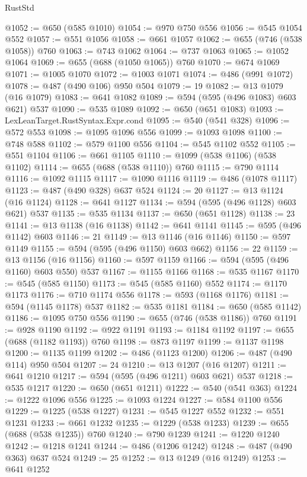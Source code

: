 \begin{lexlean}{RustStd}
\begin{coremodule}
@1052 := @650 (@585 @1010)
@1054 := @970 @750 @556
@1056 := @545 @1054 @552
@1057 := @551 @1056
@1058 := @661 @1057
@1062 := @655 (@746 (@538 @1058)) @760
@1063 := @743 @1062
@1064 := @737 @1063
@1065 := @1052 @1064
@1069 := @655 (@688 (@1050 @1065)) @760
@1070 := @674 @1069
@1071 := @1005 @1070
@1072 := @1003 @1071
@1074 := @486 (@991 @1072)
@1078 := @487 (@490 @106) @950 @504
@1079 := 19
@1082 := @13 @1079 (@16 @1079)
@1083 := @641 @1082
@1089 := @594 (@595 (@496 @1083) @603 @621) @537
@1090 := @535 @1089
@1092 := @650 (@651 @1083)
@1093 := LexLeanTarget.RustSyntax.Expr.cond
@1095 := @540 (@541 @328)
@1096 := @572 @553
@1098 := @1095 @1096 @556
@1099 := @1093 @1098
@1100 := @748 @588
@1102 := @579 @1100 @556
@1104 := @545 @1102 @552
@1105 := @551 @1104
@1106 := @661 @1105
@1110 := @1099 (@538 @1106) (@538 @1102)
@1114 := @655 (@688 (@538 @1110)) @760
@1115 := @790 @1114
@1116 := @1092 @1115
@1117 := @1090 @1116
@1119 := @486 (@1078 @1117)
@1123 := @487 (@490 @328) @637 @524
@1124 := 20
@1127 := @13 @1124 (@16 @1124)
@1128 := @641 @1127
@1134 := @594 (@595 (@496 @1128) @603 @621) @537
@1135 := @535 @1134
@1137 := @650 (@651 @1128)
@1138 := 23
@1141 := @13 @1138 (@16 @1138)
@1142 := @641 @1141
@1145 := @595 (@496 @1142) @603
@1146 := 21
@1149 := @13 @1146 (@16 @1146)
@1150 := @597 @1149
@1155 := @594 (@595 (@496 @1150) @603 @662)
@1156 := 22
@1159 := @13 @1156 (@16 @1156)
@1160 := @597 @1159
@1166 := @594 (@595 (@496 @1160) @603 @550) @537
@1167 := @1155 @1166
@1168 := @535 @1167
@1170 := @545 (@585 @1150)
@1173 := @545 (@585 @1160) @552
@1174 := @1170 @1173
@1176 := @710 @1174 @556
@1178 := @593 (@1168 @1176)
@1181 := @594 (@1145 @1178) @537
@1182 := @535 @1181
@1184 := @650 (@585 @1142)
@1186 := @1095 @750 @556
@1190 := @655 (@746 (@538 @1186)) @760
@1191 := @928 @1190
@1192 := @922 @1191
@1193 := @1184 @1192
@1197 := @655 (@688 (@1182 @1193)) @760
@1198 := @873 @1197
@1199 := @1137 @1198
@1200 := @1135 @1199
@1202 := @486 (@1123 @1200)
@1206 := @487 (@490 @114) @950 @504
@1207 := 24
@1210 := @13 @1207 (@16 @1207)
@1211 := @641 @1210
@1217 := @594 (@595 (@496 @1211) @603 @621) @537
@1218 := @535 @1217
@1220 := @650 (@651 @1211)
@1222 := @540 (@541 @363)
@1224 := @1222 @1096 @556
@1225 := @1093 @1224
@1227 := @584 @1100 @556
@1229 := @1225 (@538 @1227)
@1231 := @545 @1227 @552
@1232 := @551 @1231
@1233 := @661 @1232
@1235 := @1229 (@538 @1233)
@1239 := @655 (@688 (@538 @1235)) @760
@1240 := @790 @1239
@1241 := @1220 @1240
@1242 := @1218 @1241
@1244 := @486 (@1206 @1242)
@1248 := @487 (@490 @363) @637 @524
@1249 := 25
@1252 := @13 @1249 (@16 @1249)
@1253 := @641 @1252

\end{coremodule}
\end{lexlean}
